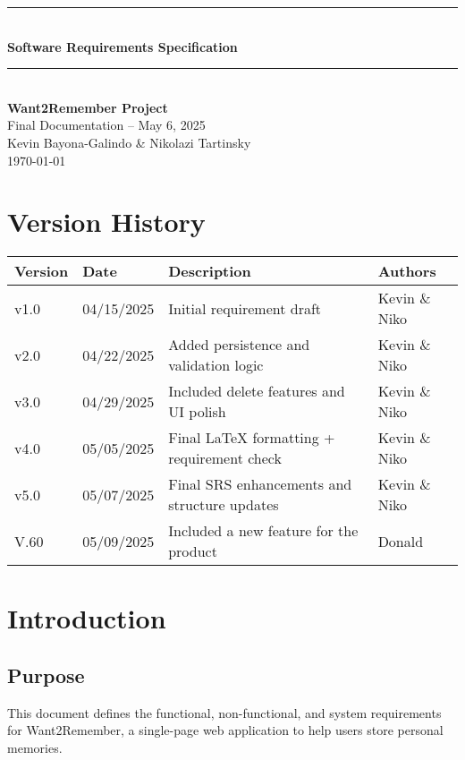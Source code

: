 \documentclass[12pt]{article}
\begin{document}
\begin{titlepage}
    \newcommand{\HRule}{\rule{\linewidth}{0.5mm}} 
    \vspace*{\fill}
    \begin{center}
        \HRule \\[0.5cm]
        {\Huge \bfseries Software Requirements Specification \\[0.4cm]}
        \HRule \\[1.5cm]
        {\LARGE \textbf{Want2Remember Project}}\\[0.5cm]
        {\Large Final Documentation – May 6, 2025}\\[2cm]
        {\Large Kevin Bayona-Galindo \& Nikolazi Tartinsky}\\[0.5cm]
        {\large \today}
    \end{center}
    \vspace*{\fill}
\end{titlepage}

\tableofcontents
\newpage

\section*{Version History}
\begin{longtable}{|p{3cm}|p{3cm}|p{6cm}|p{4cm}|}
\hline
\textbf{Version} & \textbf{Date} & \textbf{Description} & \textbf{Authors} \\
\hline
v1.0 & 04/15/2025 & Initial requirement draft & Kevin \& Niko \\
\hline
v2.0 & 04/22/2025 & Added persistence and validation logic & Kevin \& Niko \\
\hline
v3.0 & 04/29/2025 & Included delete features and UI polish & Kevin \& Niko \\
\hline
v4.0 & 05/05/2025 & Final LaTeX formatting + requirement check & Kevin \& Niko \\
\hline
v5.0 & 05/07/2025 & Final SRS enhancements and structure updates & Kevin \& Niko \\
\hline
V.60 & 05/09/2025 & Included a new feature for the product & Donald \\
\hline
\end{longtable}

\section{Introduction}
\subsection*{Purpose}
This document defines the functional, non-functional, and system requirements for Want2Remember, a single-page web application to help users store personal memories.
\end{document}
